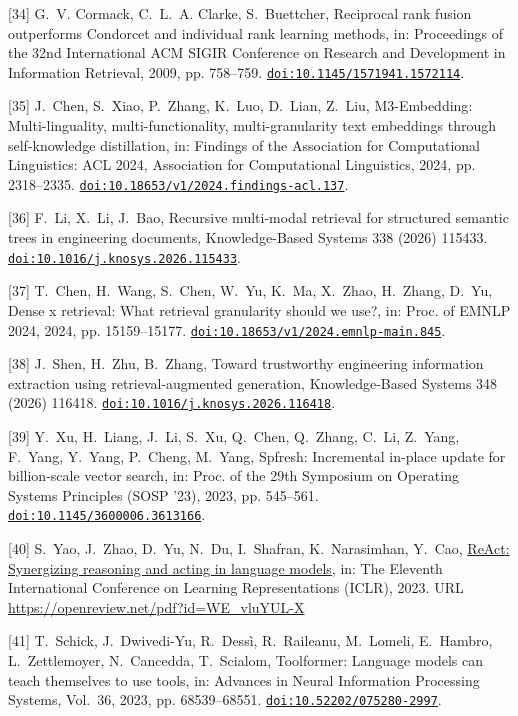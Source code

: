 [34] G.~V. Cormack, C.~L.~A. Clarke, S.~Buettcher, Reciprocal rank fusion outperforms {Condorcet} and individual rank learning methods, in: Proceedings of the 32nd International {ACM} {SIGIR} Conference on Research and Development in Information Retrieval, 2009, pp. 758--759. \href {https://doi.org/10.1145/1571941.1572114} {\texttt{doi:10.1145/1571941.1572114}}.

[35] J.~Chen, S.~Xiao, P.~Zhang, K.~Luo, D.~Lian, Z.~Liu, {M3-Embedding}: Multi-linguality, multi-functionality, multi-granularity text embeddings through self-knowledge distillation, in: Findings of the Association for Computational Linguistics: ACL 2024, Association for Computational Linguistics, 2024, pp. 2318--2335. \href {https://doi.org/10.18653/v1/2024.findings-acl.137} {\texttt{doi:10.18653/v1/2024.findings-acl.137}}.

[36] F.~Li, X.~Li, J.~Bao, Recursive multi-modal retrieval for structured semantic trees in engineering documents, Knowledge-Based Systems 338 (2026) 115433. \href {https://doi.org/10.1016/j.knosys.2026.115433} {\texttt{doi:10.1016/j.knosys.2026.115433}}.

[37] T.~Chen, H.~Wang, S.~Chen, W.~Yu, K.~Ma, X.~Zhao, H.~Zhang, D.~Yu, Dense x retrieval: What retrieval granularity should we use?, in: Proc. of EMNLP 2024, 2024, pp. 15159--15177. \href {https://doi.org/10.18653/v1/2024.emnlp-main.845} {\texttt{doi:10.18653/v1/2024.emnlp-main.845}}.

[38] J.~Shen, H.~Zhu, B.~Zhang, Toward trustworthy engineering information extraction using retrieval-augmented generation, Knowledge-Based Systems 348 (2026) 116418. \href {https://doi.org/10.1016/j.knosys.2026.116418} {\texttt{doi:10.1016/j.knosys.2026.116418}}.

[39] Y.~Xu, H.~Liang, J.~Li, S.~Xu, Q.~Chen, Q.~Zhang, C.~Li, Z.~Yang, F.~Yang, Y.~Yang, P.~Cheng, M.~Yang, Spfresh: Incremental in-place update for billion-scale vector search, in: Proc. of the 29th Symposium on Operating Systems Principles (SOSP '23), 2023, pp. 545--561. \href {https://doi.org/10.1145/3600006.3613166} {\texttt{doi:10.1145/3600006.3613166}}.

[40] S.~Yao, J.~Zhao, D.~Yu, N.~Du, I.~Shafran, K.~Narasimhan, Y.~Cao, \href{https://openreview.net/pdf?id=WE_vluYUL-X}{{ReAct}: Synergizing reasoning and acting in language models}, in: The Eleventh International Conference on Learning Representations ({ICLR}), 2023. URL \url{https://openreview.net/pdf?id=WE_vluYUL-X}

[41] T.~Schick, J.~Dwivedi-Yu, R.~Dess{\`i}, R.~Raileanu, M.~Lomeli, E.~Hambro, L.~Zettlemoyer, N.~Cancedda, T.~Scialom, Toolformer: Language models can teach themselves to use tools, in: Advances in Neural Information Processing Systems, Vol.~36, 2023, pp. 68539--68551. \href {https://doi.org/10.52202/075280-2997} {\texttt{doi:10.52202/075280-2997}}.

